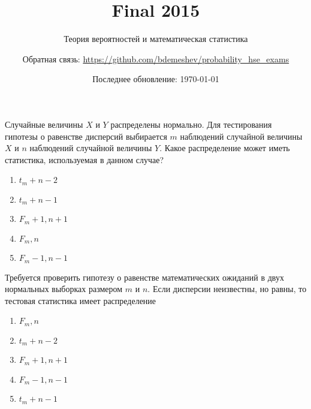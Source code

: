 \documentclass[t]{beamer}
\title{Final 2015}
\subtitle{Теория вероятностей и математическая статистика}
\author{Обратная связь: \url{https://github.com/bdemeshev/probability_hse_exams}}
\date{Последнее обновление: \today}
\begin{document}
 

\frame[plain]{\titlepage}

 \begin{frame} \label{1} 
\begin{block}{1} 

  Случайные величины $X$ и $Y$ распределены нормально. Для тестирования гипотезы о равенстве дисперсий выбирается $m$ наблюдений случайной величины $X$ и $n$ наблюдений случайной величины $Y$. Какое распределение может иметь статистика, используемая в данном случае?
  


 \end{block} 
\begin{enumerate} 
\item[] \hyperlink{1-No}{\beamergotobutton{} $t_m+n-2$}
\item[] \hyperlink{1-No}{\beamergotobutton{} $t_m+n-1$}
\item[] \hyperlink{1-No}{\beamergotobutton{} $F_m+1,n+1$}
\item[] \hyperlink{1-No}{\beamergotobutton{} $F_m,n$}
\item[] \hyperlink{1-Yes}{\beamergotobutton{} $F_m-1,n-1$}
\end{enumerate} 
\end{frame} 


 \begin{frame} \label{2} 
\begin{block}{2} 

  Требуется проверить гипотезу о равенстве математических ожиданий в двух нормальных выборках размером $m$ и $n$. Если дисперсии неизвестны, но равны, то тестовая статистика имеет распределение
  


 \end{block} 
\begin{enumerate} 
\item[] \hyperlink{2-No}{\beamergotobutton{} $F_m,n$}
\item[] \hyperlink{2-Yes}{\beamergotobutton{} $t_m+n-2$}
\item[] \hyperlink{2-No}{\beamergotobutton{} $F_m+1,n+1$}
\item[] \hyperlink{2-No}{\beamergotobutton{} $F_m-1,n-1$}
\item[] \hyperlink{2-No}{\beamergotobutton{} $t_m+n-1$}
\end{enumerate} 
\end{frame} 
\end{document}
